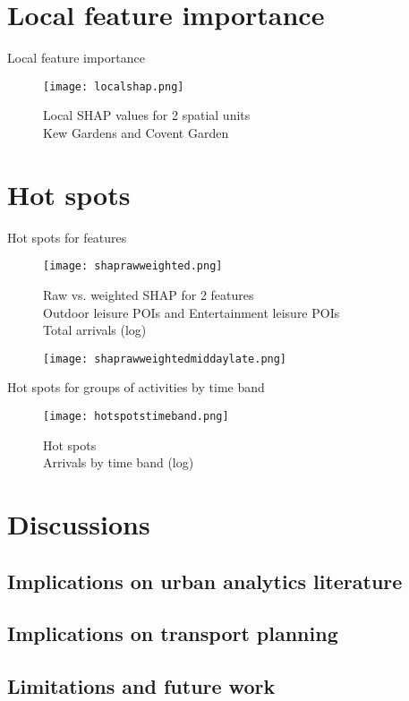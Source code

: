 \section{Local feature importance}

Local feature importance

\begin{figure}[!ht]
    \centering
    \texttt{[image: localshap.png]}
    \captionsetup{justification=centering}
    \caption{Local SHAP values for 2 spatial units\\Kew Gardens and Covent Garden}
    \label{fig:localshap}
\end{figure}




\section{Hot spots}

Hot spots for features

\begin{figure}[!ht]
    \centering
    \texttt{[image: shaprawweighted.png]}
    \captionsetup{justification=centering}
    \caption{Raw vs. weighted SHAP for 2 features\\Outdoor leisure POIs and Entertainment leisure POIs \\Total arrivals (log)}
    \label{fig:shaprawweighted}
\end{figure}


\begin{figure}[!ht]
    \centering
    \texttt{[image: shaprawweightedmiddaylate.png]}
    \captionsetup{justification=centering}
    \caption{}
    \label{fig:shaprawweightedtimeband}
\end{figure}

Hot spots for groups of activities by time band

\begin{figure}[!ht]
    \centering
    \texttt{[image: hotspotstimeband.png]}
    \captionsetup{justification=centering}
    \caption{Hot spots\\Arrivals by time band (log)}
    \label{fig:hotspottimeband}
\end{figure}


\section{Discussions}

\subsection{Implications on urban analytics literature}

\subsection{Implications on transport planning}

\subsection{Limitations and future work}